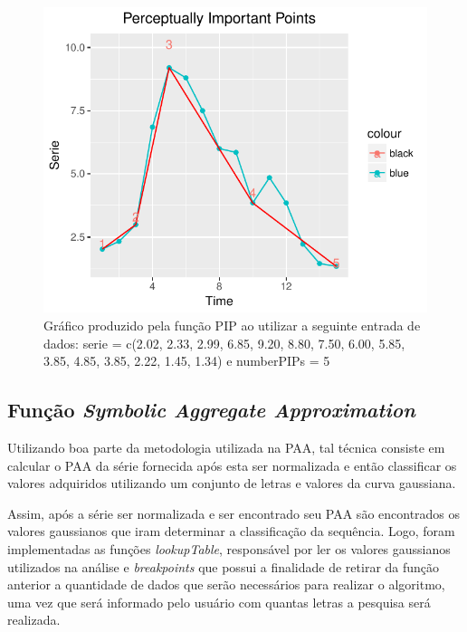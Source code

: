 \documentclass[12pt,letterpaper]{article}
\begin{document}
\begin{figure}[!hbt]
	\begin{center}
		\includegraphics[width=\columnwidth]{PIP.pdf}
		\caption{Gráfico produzido pela função PIP ao utilizar a seguinte entrada de dados: serie = c(2.02, 2.33, 2.99, 6.85, 9.20, 8.80, 7.50, 6.00, 5.85, 3.85, 4.85, 3.85, 2.22, 1.45, 1.34) e numberPIPs = 5 }
		\label{fig:PIP.pdf}
	\end{center}
\end{figure}

\subsection{Função \textit{Symbolic Aggregate Approximation}}

Utilizando boa parte da metodologia utilizada na PAA, tal técnica consiste em calcular o PAA da série fornecida após esta ser normalizada e então classificar os valores adquiridos utilizando um conjunto de letras e valores da curva gaussiana.

Assim, após a série ser normalizada e ser encontrado seu PAA são encontrados os valores gaussianos que iram determinar a classificação da sequência. Logo, foram implementadas as funções \textit{lookupTable}, responsável por ler os valores gaussianos utilizados na análise e \textit{breakpoints} que possui a finalidade de retirar da função anterior a quantidade de dados que serão necessários para realizar o algoritmo, uma vez que será informado pelo usuário com quantas letras a pesquisa será realizada.
\end{document}

